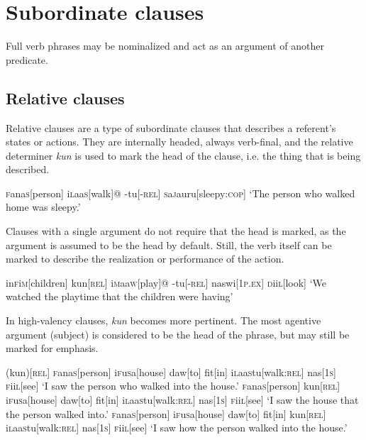 \documentclass[a4paper,10pt,twoside,openright]{memoir}
\newcommand{\famwordold}[5]{#1\textsc{#2}#3\textsc{#4}#5}
\begin{document}
\subsubsection{}

\section{Subordinate clauses}

Full verb phrases may be nominalized and act as an argument of another predicate.

\subsection{Relative clauses}

Relative clauses are a type of subordinate clauses that describes a referent's states or actions. They are internally headed, always verb-final, and the relative determiner \emph{kun} is used to mark the head of the clause, i.e. the thing that is being described.

\ex
\begingl
\famwordold{}{f}{ana}{s}{}[person]
\famwordold{i}{l}{aa}{s}{}[walk]@
-tu[\textsc{-rel}]
\famwordold{}{s}{a}{j}{a}uru[sleepy:\textsc{cop}]
\glft `The person who walked home was sleepy.'
\endgl
\xe

Clauses with a single argument do not require that the head is marked, as the argument is assumed to be the head by default. Still, the verb itself can be marked to describe the realization or performance of the action.

\ex
\begingl
\famwordold{in}{f}{i}{m}{}[children]
kun[\textsc{rel}]
\famwordold{i}{m}{aa}{w}{}[play]@
-tu[\textsc{-rel}]
naswi[\textsc{1p.ex}]
\famwordold{}{d}{ii}{l}{}[look]
\glft `We watched the playtime that the children were having'
\endgl
\xe

In high-valency clauses, \emph{kun} becomes more pertinent. The most agentive argument (subject) is considered to be the head of the phrase, but may still be marked for emphasis.

\pex[interpartskip=3ex]
\a
\begingl
(kun)[\textsc{rel}]
\famwordold{}{f}{ana}{s}{}[person]
\famwordold{i}{f}{u}{s}{a}[house]
daw[to]
fit[in]
\famwordold{i}{l}{aa}{s}{}tu[walk\textsc{:rel}]
nas[\textsc{1s}]
\famwordold{}{f}{ii}{l}{}[see]
\glft `I saw the person who walked into the house.'
\endgl
\a
\begingl
\famwordold{}{f}{ana}{s}{}[person]
kun[\textsc{rel}]
\famwordold{i}{f}{u}{s}{a}[house]
daw[to]
fit[in]
\famwordold{i}{l}{aa}{s}{}tu[walk\textsc{:rel}]
nas[\textsc{1s}]
\famwordold{}{f}{ii}{l}{}[see]
\glft `I saw the house that the person walked into.'
\endgl
\a
\begingl
\famwordold{}{f}{ana}{s}{}[person]
\famwordold{i}{f}{u}{s}{a}[house]
daw[to]
fit[in]
kun[\textsc{rel}]
\famwordold{i}{l}{aa}{s}{}tu[walk\textsc{:rel}]
nas[\textsc{1s}]
\famwordold{}{f}{ii}{l}{}[see]
\glft `I saw how the person walked into the house.'
\endgl
\xe
\end{document}
